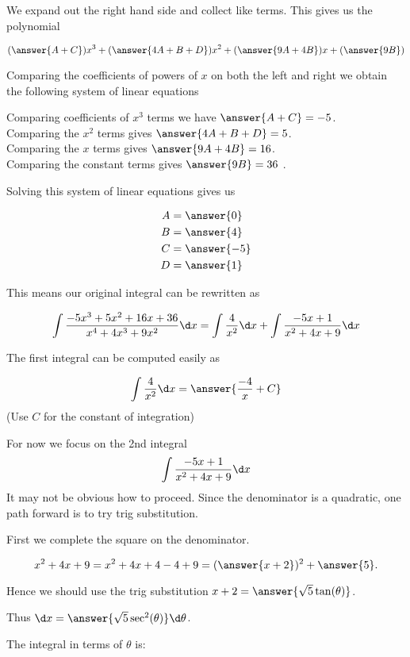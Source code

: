 \documentclass{ximera}
\begin{document}
\begin{exercise}
\begin{exercise}
We expand out the right hand side and collect like terms. This gives us the polynomial

\[
(\answer{A+C})x^3+(\answer{4A+B+D})x^2+(\answer{9A+4B})x+(\answer{9B})
\]


\begin{exercise}

Comparing the coefficients of powers of $x$ on both the left and right we obtain the following system of linear equations

Comparing coefficients of $x^3$ terms we have $\answer{A+C}=-5$. \\
Comparing the $x^2$ terms gives $\answer {4A+B+D}=5$. \\
Comparing the $x$ terms gives $\answer{9A+4B}=16$. \\
Comparing the constant terms gives $\answer{9B}=36$ .

Solving this system of linear equations gives us

\begin{align*}
A&=\answer{  0 }\\
B&=\answer{4   }\\
C&=\answer{  -5 }\\
D&=\answer{1    }
\end{align*}


This means our original integral can be rewritten as 

\[
\int \frac{-5x^3+5x^2+16x+36}{x^{4}+4x^3+9x^2} \d x= \int \frac{4}{x^2} \d x + \int \frac{-5x+1}{x^2+4x+9} \d x 
\]

The first integral can be computed easily as

\[
\int \frac{4}{x^2} \d x=\answer{\frac{-4}{x}+C}
\]
(Use $C$ for the constant of integration)

\begin{exercise}

For now we focus on the 2nd integral 
\[
\int \frac{-5x+1}{x^2+4x+9} \d x 
\]
It may not be obvious how to proceed. Since the denominator is a quadratic, one path forward is to try trig substitution.

First we complete the square on the denominator. 

\[
x^2+4x+9=x^2+4x+4-4+9=(\answer{x+2})^2+\answer{5}.
\]

Hence we should use the trig substitution $x+2=\answer{\sqrt{5}\tan(\theta)}$. 

Thus $\d x=\answer{ \sqrt{5} \sec^{2}(\theta)} \d \theta$. 

The integral in terms of $\theta$ is:


\end{exercise}
\end{exercise}
\end{exercise}
\end{exercise}
\end{document}
